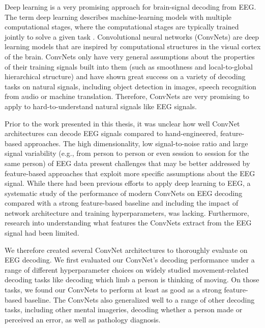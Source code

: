 Deep learning is a very promising approach for brain-signal decoding
from EEG. The term deep learning describes machine-learning models with
multiple computational stages, where the computational stages are
typically trained jointly to solve a given task
\citep{lecun_deep_2015,schmidhuber_deep_2015}.
Convolutional neural networks (ConvNets) are deep learning models that
are inspired by computational structures in the visual cortex of the
brain. ConvNets only have very general assumptions about the properties of their training signals built into them (such as smoothness and local-to-global hierarchical structure) and have shown great success on a variety of  decoding tasks  on natural signals, including object detection in images, speech recognition from audio or machine translation. Therefore, ConvNets are very promising to apply to hard-to-understand natural signals like EEG signals.

    Prior to the work presented in this thesis, it was unclear how well
ConvNet architectures can decode EEG signals compared to
hand-engineered, feature-based approaches. The high dimensionality, low
signal-to-noise ratio and large signal variability (e.g., from person to
person or even session to session for the same person) of EEG data
present challenges that may be better addressed by feature-based
approaches that exploit more specific assumptions about the EEG signal.
While there had been previous efforts to apply deep learning to EEG, a
systematic study of the performance of modern ConvNets on EEG decoding
compared with a strong feature-based baseline and including the impact
of network architecture and training hyperparameters, was lacking.
Furthermore, research into understanding what features the ConvNets
extract from the EEG signal had been limited.

    We therefore created several ConvNet architectures to thoroughly
evaluate on EEG decoding. We first evaluated our ConvNet's decoding
performance under a range of different hyperparameter choices on widely
studied movement-related decoding tasks like decoding which limb a
person is thinking of moving. On those tasks, we found our ConvNets to
perform at least as good as a strong feature-based baseline. The
ConvNets also generalized well to a range of other decoding tasks,
including other mental imageries, decoding whether a person made or
perceived an error, as well as pathology diagnosis.

